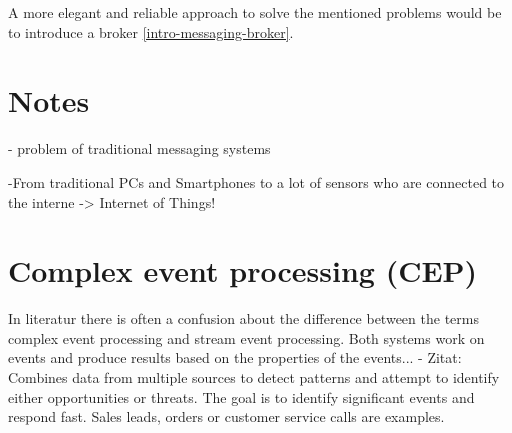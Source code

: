 A more elegant and reliable approach to solve the mentioned problems would be to
introduce a broker \ref{intro-messaging-broker}.


\section{Notes}
- problem of traditional messaging systems


-From traditional PCs and Smartphones to a lot of sensors who are connected to
the interne -> Internet of Things!


\section{Complex event processing (CEP)}
In literatur there is often a confusion about the difference between the terms
complex event processing and stream event processing. Both systems work on
events and produce results based on the properties of the events... 
- Zitat: Combines data from multiple sources  to detect patterns and attempt to
identify either opportunities or threats. The goal is to identify significant
events and respond fast. Sales leads, orders or customer service calls are
examples.\\


